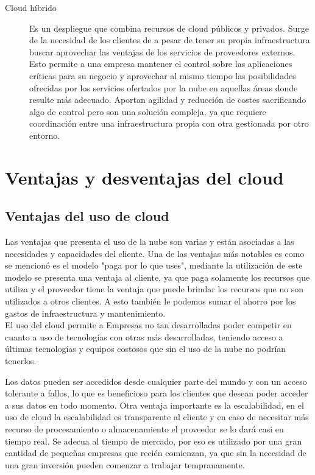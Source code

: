 \begin{description}
    \item[Cloud híbrido]
        Es un despliegue que combina recursos de cloud públicos y privados. Surge de la necesidad de los clientes de a pesar de tener su propia infraestructura buscar aprovechar las ventajas de los servicios de proveedores externos.
        Esto permite a una empresa mantener el control sobre las aplicaciones críticas para su negocio y aprovechar al mismo tiempo las posibilidades ofrecidas por los servicios ofertados por la nube en aquellas áreas donde resulte más adecuado. Aportan agilidad y reducción de costes sacrificando algo de control pero son una solución compleja, ya que requiere coordinación entre una infraestructura propia con otra gestionada por otro entorno.

\end{description}

\section{Ventajas y desventajas del cloud}
\subsection {Ventajas del uso de cloud}
Las ventajas que presenta el uso de la nube son varias y están asociadas a las necesidades y capacidades del cliente. Una de las ventajas más notables es como se mencionó es el modelo "paga por lo que uses", mediante la utilización de este modelo se presenta una ventaja al cliente, ya que paga solamente los recursos que utiliza y el proveedor tiene la ventaja que puede brindar los recursos que no son utilizados a otros clientes. A esto también le podemos sumar el ahorro por los gastos de infraestructura y mantenimiento. \\
El uso del cloud permite a Empresas no tan desarrolladas poder competir en cuanto a uso de tecnologías con otras más desarrolladas, teniendo acceso a últimas tecnologías y equipos costosos que sin el uso de la nube no podrían tenerlos.

Los datos pueden ser accedidos desde cualquier parte del mundo y con un acceso tolerante a fallos, lo que es beneficioso para los clientes que desean poder acceder a sus datos en todo momento.
Otra ventaja importante es la escalabilidad, en el uso de cloud la escalabilidad es transparente al cliente y en caso de necesitar más recurso de procesamiento o almacenamiento el proveedor se lo dará casi en tiempo real.
Se adecua al tiempo de mercado, por eso es utilizado por una gran cantidad de pequeñas empresas que recién comienzan, ya que sin la necesidad de una gran inversión pueden comenzar a trabajar tempranamente.

